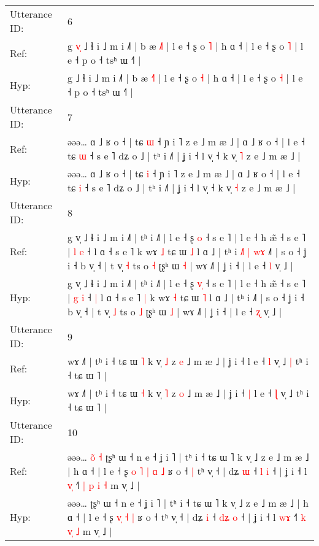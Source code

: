 \documentclass[10pt]{article}
\DeclareRobustCommand{\hl}[1]{{\textcolor{red}{#1}}}
\begin{document}
\begin{longtable}{ll}
 \\
\midrule
Utterance ID: & 6 \\
Ref: & g\hl{ }\hl{v}\hl{̩} ˩ ɬ i ˩ m i ˩˥ | b æ \hl{˩}˥ | l e ˧ ʂ o \hl{˥} | h ɑ ˧ | l e ˧ ʂ o \hl{˥} | l e ˧ p o ˧ tsʰ ɯ ˧˥ |
 \\
Hyp: & g\hl{}\hl{}\hl{} ˩ ɬ i ˩ m i ˩˥ | b æ \hl{˧}˥ | l e ˧ ʂ o \hl{˧} | h ɑ ˧ | l e ˧ ʂ o \hl{˧} | l e ˧ p o ˧ tsʰ ɯ ˧˥ |
 \\
\midrule
Utterance ID: & 7 \\
Ref: & əəə… ɑ ˩ ʁ o ˧ | tɕ \hl{ɯ} ˧ ɲ i ˥ z e ˩ m æ ˩ | ɑ ˩ ʁ o ˧ | l e ˧ tɕ \hl{ɯ} ˧ s e ˥ dʑ o ˩ | tʰ i ˩˥ | ʝ i ˧ l v̩ ˧ k v̩ \hl{˥} z e ˩ m æ ˩ |
 \\
Hyp: & əəə… ɑ ˩ ʁ o ˧ | tɕ \hl{i} ˧ ɲ i ˥ z e ˩ m æ ˩ | ɑ ˩ ʁ o ˧ | l e ˧ tɕ \hl{i} ˧ s e ˥ dʑ o ˩ | tʰ i ˩˥ | ʝ i ˧ l v̩ ˧ k v̩ \hl{˧} z e ˩ m æ ˩ |
 \\
\midrule
Utterance ID: & 8 \\
Ref: & g v̩ ˩ ɬ i ˩ m i ˩˥ | tʰ i ˩˥ | l e ˧ ʂ \hl{}\hl{o} ˧ s e ˥ | l e ˧ h æ̃ ˧ s e ˥ | \hl{l} \hl{e} ˧\hl{}\hl{} l ɑ ˧ s e ˥\hl{}\hl{} k wɤ \hl{˩} tɕ ɯ \hl{˩} l ɑ ˩ | tʰ i\hl{ }\hl{˩}\hl{˥}\hl{ }\hl{|}\hl{ }\hl{w}\hl{ɤ} ˩˥ | s o ˧ ʝ i ˧ b v̩ ˧ | t v̩ \hl{˧} ts o \hl{˧} ʈʂʰ ɯ \hl{˧} | wɤ ˩˥ | ʝ i ˧ | l e ˧ \hl{l} v̩ ˩ |
 \\
Hyp: & g v̩ ˩ ɬ i ˩ m i ˩˥ | tʰ i ˩˥ | l e ˧ ʂ \hl{v}\hl{̩} ˧ s e ˥ | l e ˧ h æ̃ ˧ s e ˥ | \hl{g} \hl{i} ˧\hl{ }\hl{|} l ɑ ˧ s e ˥\hl{ }\hl{|} k wɤ \hl{˧} tɕ ɯ \hl{˥} l ɑ ˩ | tʰ i\hl{}\hl{}\hl{}\hl{}\hl{}\hl{}\hl{}\hl{} ˩˥ | s o ˧ ʝ i ˧ b v̩ ˧ | t v̩ \hl{˩} ts o \hl{˩} ʈʂʰ ɯ \hl{˩} | wɤ ˩˥ | ʝ i ˧ | l e ˧ \hl{ʐ} v̩ ˩ |
 \\
\midrule
Utterance ID: & 9 \\
Ref: & wɤ ˩˥ | tʰ i ˧ tɕ ɯ \hl{˥} k v̩ \hl{˩} z \hl{e} ˩ m æ ˩ | ʝ i ˧\hl{}\hl{} l e ˧ \hl{l} v̩ ˩\hl{ }\hl{|} tʰ i ˧ tɕ ɯ ˥ |
 \\
Hyp: & wɤ ˩˥ | tʰ i ˧ tɕ ɯ \hl{˧} k v̩ \hl{˥} z \hl{o} ˩ m æ ˩ | ʝ i ˧\hl{ }\hl{|} l e ˧ \hl{ɭ} v̩ ˩\hl{}\hl{} tʰ i ˧ tɕ ɯ ˥ |
 \\
\midrule
Utterance ID: & 10 \\
Ref: & əəə…\hl{ }\hl{o}\hl{̃}\hl{ }\hl{˧} ʈʂʰ ɯ ˧ n e ˧ ʝ i ˥ | tʰ i ˧ tɕ ɯ ˥ k v̩ ˩ z e ˩ m æ ˩ | h ɑ ˧ | l e ˧ ʂ\hl{ }\hl{o} \hl{˥}\hl{ }\hl{|} \hl{ɑ} \hl{˩} ʁ o ˧\hl{ }\hl{|} tʰ v̩ ˧ | dʑ \hl{ɯ} ˧ \hl{}\hl{l} \hl{i} ˧ | ʝ i ˧ l \hl{v}\hl{̩} ˧˥ \hl{|} \hl{p}\hl{ }\hl{i} \hl{˧} m v̩ ˩ |
 \\
Hyp: & əəə…\hl{}\hl{}\hl{}\hl{}\hl{} ʈʂʰ ɯ ˧ n e ˧ ʝ i ˥ | tʰ i ˧ tɕ ɯ ˥ k v̩ ˩ z e ˩ m æ ˩ | h ɑ ˧ | l e ˧ ʂ\hl{}\hl{} \hl{}\hl{v}\hl{̩} \hl{˧} \hl{|} ʁ o ˧\hl{}\hl{} tʰ v̩ ˧ | dʑ \hl{i} ˧ \hl{d}\hl{ʑ} \hl{o} ˧ | ʝ i ˧ l \hl{w}\hl{ɤ} ˧˥ \hl{k} \hl{}\hl{v}\hl{̩} \hl{˩} m v̩ ˩ |

\end{longtable}
\end{document}
